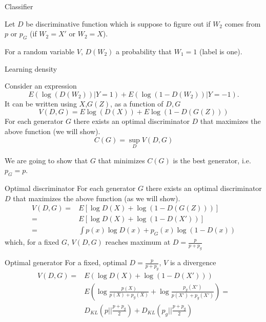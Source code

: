 \documentclass{beamer}
\begin{document}
  
   
\begin{frame}{Classifier}

Let $D$ be discriminative function which is suppose to figure out if $W_2$ comes from $p$ or $p_G$ (if $W_2 = X'$ or $W_2=X$). 

For a random variable  $V$,  $D(W_2)$ a probability that $W_1 =1$ (label is one).  

\end{frame}
  
  
  
  
\begin{frame}{Learning density}

Consider an expression  
$$
E \left( \log(D(W_2)) | Y=1 \right)  + E \left( \log(1 - D(W_2))| Y=-1  \right).
$$
It can be written using $X$,$G(Z)$, as a function of $D,G$
$$
V(D,G) = E \log(D(X)) + E \log(1 - D(G(Z)))
$$
For each generator  $G$ there exists an optimal  discriminator $D$ that maximizes the above function (we will show). 
$$C(G) = \sup_{D} V(D,G)$$

We are going to show that $G$ that minimizes $C(G)$ is the best generator, i.e. $p_G = p$.
\end{frame}
  
\begin{frame}{Optimal discriminator}
For each generator  $G$ there exists an optimal  discriminator $D$ that maximizes the above function (as we will show).
\begin{align}
V(D,G) =& E \left[ \log D(X) +  \log(1 - D(G(Z)))  \right] \\ 
       =& E\left[  \log D(X) +  \log(1 - D(X')) \right] \\
       =& \int p(x)  \log D(x) +  p_G(x) \log(1 - D(x))
\end{align}
which, for a fixed $G$, $V(D,G)$ reaches  maximum  at $D = \frac{p}{p+p_g}$


\end{frame}


  
\begin{frame}{Optimal generator }
For a fixed, optimal $D = \frac{p}{p+p_g} $, $V$ is a divergence 
\begin{align}
V(D,G) =& E \left(  \log D(X) + \log(1 - D(X')) \right) \\ 
&E \left(   \log \frac{p(X)}{p(X)+p_g(X)} + \log \frac{p_g(X')}{p(X')+p_g(X')} \right) =\\
&D_{KL}(p || \frac{p+p_g}{2} ) + D_{KL}(p_g ||  \frac{p+p_g}{2})
\end{align}

\end{frame}  
\end{document}

